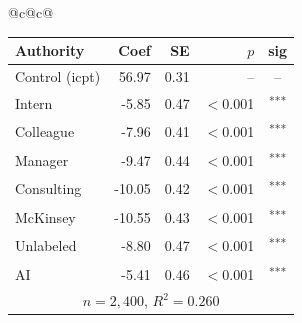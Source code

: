 \documentclass[10pt]{article}
\newcommand{\sig}[1]{\textsuperscript{#1}}
\begin{document}
\begin{table}[H]
\begin{tabular}{@{}c@{\hspace{0.5em}}c@{}}
\begin{minipage}[t]{0.49\textwidth}
\begin{tabular}{@{}l r r r c@{}}
\toprule
Authority & Coef & SE & $p$ & sig \\
\midrule
\cellcolor{gray!22}Control (icpt) & \cellcolor{gray!22}56.97 & \cellcolor{gray!22}0.31 & \cellcolor{gray!22}-- & \cellcolor{gray!22}-- \\
\midrule
Intern & -5.85 & 0.47 & $<$0.001 & \sig{***} \\
Colleague & -7.96 & 0.41 & $<$0.001 & \sig{***} \\
Manager & -9.47 & 0.44 & $<$0.001 & \sig{***} \\
\midrule
Consulting & -10.05 & 0.42 & $<$0.001 & \sig{***} \\
McKinsey & -10.55 & 0.43 & $<$0.001 & \sig{***} \\
\midrule
Unlabeled & -8.80 & 0.47 & $<$0.001 & \sig{***} \\
AI & -5.41 & 0.46 & $<$0.001 & \sig{***} \\
\midrule
\multicolumn{5}{c}{\scriptsize $n=2{,}400$, $R^2=0.260$} \\
\bottomrule\end{tabular}
\end{minipage} \\
\end{tabular}
\end{table}
\end{document}
